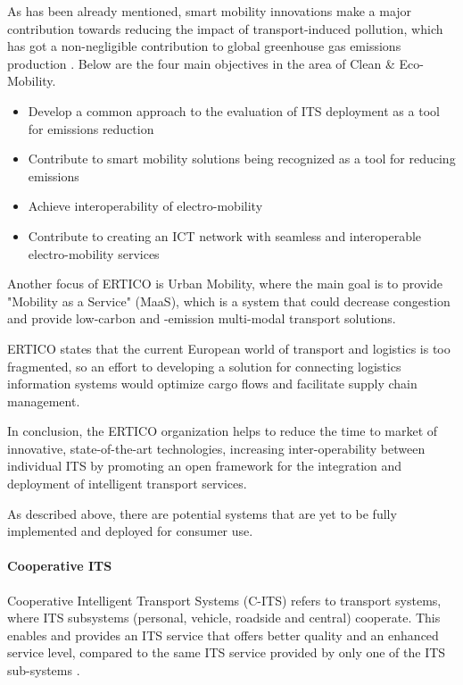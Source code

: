 \documentclass[main.tex]{subfiles}
\begin{document}
As has been already mentioned, smart mobility innovations make a major contribution towards 
reducing the impact of transport-induced pollution, which has got a non-negligible contribution to 
global greenhouse gas emissions production \cite{Ritchie2020}. Below are the four main
objectives in the area of Clean \& Eco-Mobility. 

\begin{itemize}
    \setlength\itemsep{-10pt}
    \item Develop a common approach to the evaluation of ITS deployment as a tool for emissions reduction
    \item Contribute to smart mobility solutions being recognized as a tool for reducing emissions
    \item Achieve interoperability of electro-mobility
    \item Contribute to creating an ICT network with seamless and interoperable electro-mobility services
\end{itemize}

Another focus of ERTICO is Urban Mobility, where the main goal is to provide "Mobility as a Service" (MaaS), 
which is a system that could decrease congestion and provide low-carbon and -emission multi-modal transport 
solutions.  

ERTICO states that the current European world of transport and logistics is too fragmented, so an effort to 
developing a solution for connecting logistics information systems would optimize cargo flows and facilitate supply 
chain management. 

In conclusion, the ERTICO organization helps to reduce the time to market of innovative,
state-of-the-art technologies, increasing inter-operability between individual ITS by promoting
an open framework for the integration and deployment of intelligent transport services. 

As described above, there are potential systems that are yet to be fully implemented and
deployed for consumer use. 

\paragraph{Cooperative ITS}

Cooperative Intelligent Transport Systems (C-ITS) refers to transport systems, where ITS 
subsystems (personal, vehicle, roadside and central) cooperate. This
enables and provides an ITS service that offers better quality and an enhanced service level,
compared to the same ITS service provided by only one of the ITS sub-systems \cite{2022}.
\end{document}

